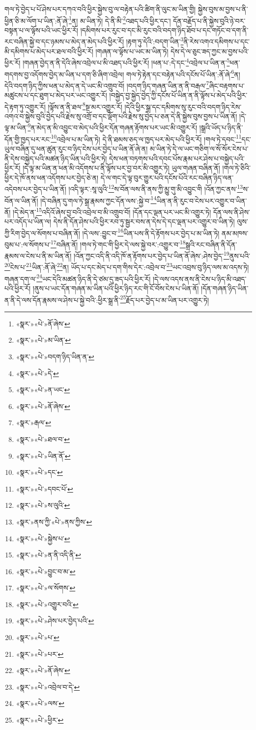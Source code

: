གལ་ཏེ་བྱེད་པ་པོ་ཤེས་པར་དཀའ་བའི་ཕྱིར་སྐྱེས་བུ་ལ་བརྟེན་པའི་ཚིག་ནི་ལུང་མ་ཡིན་གྱི། སྐྱེས་བུས་མ་བྱས་པ་ནི་ཕྱིན་ཅི་མ་ལོག་པ་ཡིན་:ནོ་ཞེ་\footnote{«སྣར་»«པེ་»ནོ་ཞེས་}ན། མ་ཡིན་ཏེ། དེ་ནི་མི་\footnote{«སྣར་»«པེ་»མ་ཡིན་}འཐད་པའི་ཕྱིར་དང་། དོན་བརྗོད་པ་ནི་སྐྱེས་བུའི་ཉེ་བར་བསྟན་པ་ལ་ལྟོས་པའི་ཡང་ཕྱིར་རོ། །དམིགས་པར་རུང་བ་དང་མི་རུང་བའི་བདག་ཉིད་ཐོབ་པ་དང་གཏོང་བ་དག་ནི་རང་བཞིན་སྐྱེ་བ་དང་ཉམས་པ་མེད་ན་མེད་པའི་ཕྱིར་རོ། །རྟག་ཏུ་དེའི་:བདག་ཡིན་\footnote{«སྣར་»«པེ་»བདག་ཉིད་ཡིན་ན་}ནི་རེས་འགའ་དམིགས་པ་དང་མི་དམིགས་པ་མེད་པར་ཐལ་བའི་ཕྱིར་རོ། །གཞན་ལ་ལྟོས་པ་ཡང་མ་ཡིན་ཏེ། དེས་དེ་ལ་ཅུང་ཟད་ཀྱང་མ་བྱས་པའི་ཕྱིར་རོ། །གཞན་བྱེད་ན་ནི་དེའི་ཞེས་འབྲེལ་པ་མི་འཐད་པའི་ཕྱིར་རོ། །ཕན་པ་:དེ་དང་\footnote{«སྣར་»«པེ་»དེ་}འབྲེལ་པ་ཡིན་ན་\footnote{«སྣར་»«པེ་»ན་ཡང་}ཕན་གདགས་བྱ་འདོགས་བྱེད་མ་ཡིན་པ་དག་ཅི་ཞིག་འབྲེལ། གལ་ཏེ་རྟེན་དང་བརྟེན་པའི་དངོས་པོ་ཡིན་:ནོ་ཞེ་\footnote{«སྣར་»«པེ་»ནོ་ཞེས་}ན། དེའི་བདག་ཉིད་ཀྱིས་ཕན་པ་མེད་ན་དེ་ཡང་མི་འགྲུབ་བོ། །བདག་ཉིད་གཞན་ཡིན་ན་ནི་བརྒལ་\footnote{«སྣར་»རྒལ་}ཞིང་བརྟགས་པ་མཚུངས་པ་དང་ཐུག་པ་མེད་པར་ཡང་འགྱུར་རོ། །བསྐྱེད་བྱ་སྐྱེད་བྱེད་ཀྱི་དངོས་པོ་ཡིན་ན་ནི་ལྟོས་པ་མེད་པའི་ཕྱིར་དེ་རྟག་ཏུ་འགྱུར་རོ། །ལྟོས་ན་ནི་ཐལ་\footnote{«སྣར་»«པེ་»ཐལ་བ་}སྔ་མར་འགྱུར་རོ། །དེའི་ཕྱིར་སྒྲ་དང་དམིགས་སུ་རུང་བའི་བདག་ཉིད་རེས་འགའ་བ་སྐྱེས་བུའི་བྱེད་པའི་རྗེས་སུ་འགྲོ་བ་དང་ལྡོག་པའི་རྗེས་སུ་བྱེད་པ་ཅན་དེ་ནི་སྐྱེས་བུས་བྱས་པ་ཡིན་ནོ། །དེ་ལྟ་མ་ཡིན་\footnote{«སྣར་»«པེ་»ཡིན་ནོ་}ན་མེད་ན་མི་འབྱུང་བ་མེད་པའི་ཕྱིར་དོན་གཞན་རྟོགས་པར་ཡང་མི་འགྱུར་རོ། །སྒྲའི་ཡོད་པ་ཉིད་ནི་དོན་གྱི་ཁྱད་པར་རང་\footnote{«སྣར་»«པེ་»དང་}འབྲེལ་པ་མ་ཡིན་ཏེ། དེ་ནི་ཐམས་ཅད་ལ་ཁྱད་པར་མེད་པའི་ཕྱིར་རོ། །གལ་ཏེ་དབང་\footnote{«སྣར་»«པེ་»དབང་པོ་}དང་ཡུལ་བཞིན་དུ་ཕན་ཚུན་རུང་བ་ཉིད་ངེས་པར་བྱེད་པ་ཡིན་ནོ་ཞེ་ན། མ་ཡིན་ཏེ་དེ་ལ་ཡང་གཅིག་ལ་སོ་སོར་ངེས་པ་ནི་དེས་བསྐྱེད་པའི་མཚན་ཉིད་ཡིན་པའི་ཕྱིར་ཏེ། དེས་ཕན་བཏགས་པའི་དབང་པོས་རྣམ་པར་ཤེས་པ་བསྐྱེད་པའི་ཕྱིར་རོ། །དེ་ལྟ་མ་ཡིན་ན་ཕན་མི་འདོགས་པ་ནི་ལྟོས་པར་བྱ་བར་མི་འགྱུར་ཏེ། ཡུལ་གཞན་བཞིན་ནོ། །གལ་ཏེ་ཅིའི་ཕྱིར་དེ་ཁོ་ནས་ཕན་འདོགས་པར་བྱེད་ཅེ་ན། དེ་ལ་གང་དེ་ལྟ་བུར་གྱུར་པའི་དངོས་པོའི་རང་བཞིན་ཉིད་ལན་འདེབས་པར་བྱེད་པ་ཡིན་ནོ། །འདི་ལྟར་:སཱ་ལུའི་\footnote{«སྣར་»«པེ་»ས་ལུའི་}ས་བོན་ལས་ནི་ནས་ཀྱི་མྱུ་གུ་མི་འབྱུང་གི །འོན་ཀྱང་ནས་\footnote{«སྣར་»ནས་ཀྱི་«པེ་»ནས་ཀྱིས་}ས་བོན་ལ་ཡིན་ནོ། །དེ་བཞིན་དུ་གལ་ཏེ་སྒྲ་རྣམས་ཀྱང་དོན་ལས་:སྐྱེ་བ་\footnote{«སྣར་»«པེ་»སྐྱེས་པ་}ཡིན་ན་ནི་རུང་བ་ངེས་པར་འགྱུར་བ་ཡིན་ནོ། །དེ་མེད་ན་\footnote{«སྣར་»«པེ་»ན་ནི་འདི་ནི་}འདིའོ་ཞེས་བྱ་བའི་འབྲེལ་བ་མི་འགྲུབ་བོ། །དོན་དང་ལྡན་པར་ཡང་མི་འགྱུར་ཏེ། དོན་ལས་ནི་ཤེས་པར་འདོད་པ་ཡིན་ལ། དེས་ནི་དོན་ཤེས་པའི་ཕྱིར་རབ་ཏུ་སྦྱར་བས་ན་དེས་དེ་དང་ལྡན་པར་འགྱུར་བ་ཡིན་ཏེ། ལུས་ཀྱི་རིག་བྱེད་ལ་སོགས་པ་བཞིན་ནོ། །དེ་ལས་:བྱུང་བ་\footnote{«སྣར་»«པེ་»བྱུང་བ་མ་}ཡིན་པས་ནི་དེ་རྟོགས་པར་བྱེད་པ་མ་ཡིན་ཏེ། ནམ་མཁས་བུམ་པ་:ལ་སོགས་པ་\footnote{«སྣར་»«པེ་»ལ་སོགས་}བཞིན་ནོ། །གལ་ཏེ་གང་གི་ཕྱིར་དེ་ལས་སྐྱེ་བར་:འགྱུར་བ་\footnote{«སྣར་»«པེ་»འགྱུར་བའི་}སྒྲའི་རང་བཞིན་ནི་དོན་རྣམས་ལ་ངེས་པ་ནི་མ་ཡིན་ནོ། །འོན་ཀྱང་འདི་ནི་འདི་ཁོ་ན་རྟོགས་པར་བྱེད་པ་ཡིན་ནོ་ཞེས་:ཤེས་བྱེད་\footnote{«སྣར་»«པེ་»ཤེས་པར་བྱེད་པའི་}ནུས་པའི་\footnote{«སྣར་»«པེ་»པ་}ངེས་པ་\footnote{«སྣར་»«པེ་»པར་}ཡིན་:ནོ་ཞེ་\footnote{«སྣར་»«པེ་»ནོ་ཞེས་}ན། ཡོད་པ་དང་མེད་པ་དག་གིས་དེར་:འབྲེལ་བ་\footnote{«སྣར་»«པེ་»འབྲེལ་བ་དེ་}ཡང་འབྲས་བུ་ཉིད་ལས་མ་འདས་ཏེ། གཞན་དག་ལ་\footnote{«སྣར་»«པེ་»ལས་}ཡང་དེའི་མཚན་ཉིད་ནི་དེ་ཙམ་དུ་ཟད་པའི་ཕྱིར་རོ། །དེ་ལས་འདས་ནས་ནི་ངེས་པ་ཉིད་མི་འཐད་པའི་ཕྱིར་རོ། །ནུས་པ་ཡང་དོན་གཞན་མ་ཡིན་པའི་ཕྱིར་ཉིད་རང་གི་ངོ་བོས་ངེས་པ་ཡིན་ནོ། །དོན་གཞན་ཉིད་ཡིན་ན་ནི་དེ་ལས་དོན་རྣམས་ལ་ཤེས་པ་སྐྱེ་བའི་:ཕྱིར་སྒྲ་ནི་\footnote{«སྣར་»«པེ་»ཕྱིར་}རྗོད་པར་བྱེད་པ་མ་ཡིན་པར་འགྱུར་ཏེ། 